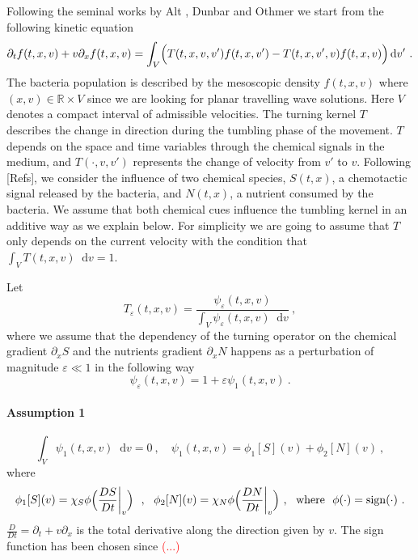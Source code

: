 \documentclass[11pt,twoside]{article}
\DeclareMathOperator{\sign}{sign}
\newcommand*\diff{\mathop{}\!\mathrm{d}}
\begin{document}
Following the seminal works by Alt \cite{alt1980biased}, Dunbar and Othmer \cite{othmer1988models}  we start from the following kinetic equation 
\begin{equation}
    \partial_t f(t,x,v)+{v}\partial_x f(t,x,v)= \int_{V}\Bigl(T(t,x,v,v')f(t,x,v')-  T(t,x,{v}',v)f(t,x,v)\Bigr)\diff v'\ .\label{eq: main kinetic}
\end{equation}
The bacteria population is described by the mesoscopic density $f(t,x,v)$ where $(x,v)\in\mathbb{R}\times V$ since we are looking for planar travelling wave solutions. Here $V$ denotes a compact interval of admissible velocities. The turning kernel $T$ describes the change in direction during the tumbling phase of the movement. $T$ depends on the space and time variables through the chemical signals in the medium,  and $T(\cdot, v,v')$ represents the change of velocity from $v'$ to $v$. Following [Refs], we consider the influence of two chemical species, $S(t,x)$, a chemotactic signal released by the bacteria, and $N(t,x)$, a nutrient consumed by the bacteria. We assume that both chemical cues influence the tumbling kernel in an additive way as we explain below. For simplicity we are going to assume that $T$ only depends on the current velocity with the condition that $\int_VT(t,x,v)\diff v=1$.

Let 
\begin{equation}\label{TepsFeps}
    T_\varepsilon(t,x,v)=\frac{\psi_\varepsilon(t,x,{v}) }{\displaystyle\int_{V}\psi_\varepsilon(t,x,{v})  \diff {v}}\ ,
\end{equation}
where we assume that the dependency of the turning operator on the chemical gradient $\partial_x S$ and the nutrients gradient $\partial_x N$ happens as a perturbation of magnitude $\varepsilon\ll 1$ in the following way
\begin{equation}\label{expansion_psi}
    \psi_\varepsilon(t,x,{v})=1+\varepsilon\psi_1(t,x,{v})\ .
\end{equation}
\paragraph{Assumption 1}
\begin{equation}\tag{A1}
\int_V\psi_1(t,x,{v})\diff {v}=0\ , \quad \psi_1(t,x,{v}) = \phi_1[S]({v}) + \phi_2[N]({v})\ , \label{hypo2}
\end{equation}
where
$$\phi_1[S]({v})=\chi_S\phi\Bigl(\frac{DS}{Dt}\bigg\rvert_{v}\Bigr)\ \ ,\ \ \phi_2[N](v)= \chi_N\phi\Bigl(\frac{DN}{Dt}\bigg\rvert_{v}\Bigr)\ ,\ \ \textnormal{where}\ \ \phi(\cdot)=\sign(\cdot)\ .$$
 $\frac{D}{Dt}=\partial_t+{v}\partial_x$ is the total derivative along the direction given by ${v}$. The sign function has been chosen since \textcolor{red}{(...)}
\end{document}
